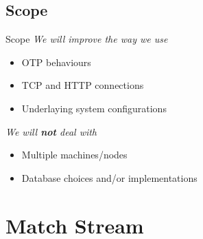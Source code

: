 \documentclass[utf8,hyperref={colorlinks=true}]{beamer}
\begin{document}
\subsection{Scope}
\begin{frame}{Scope}
	\emph{We will improve the way we use}
	\begin{itemize}
		\item OTP behaviours
		\item TCP and HTTP connections
		\item Underlaying system configurations
	\end{itemize}
	\pause
	\emph{We will \textbf{not} deal with}
	\begin{itemize}
		\item Multiple machines/nodes
		\item Database choices and/or implementations
	\end{itemize}
\end{frame}

\section{Match Stream}
\end{document}
